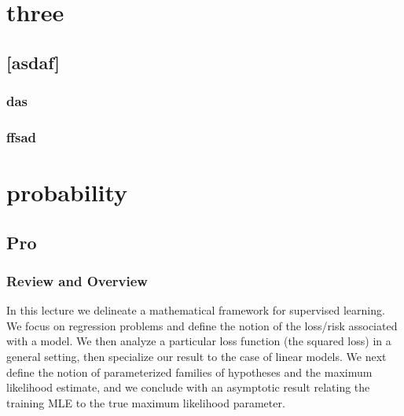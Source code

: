 \documentclass[]{subook}
\begin{document}
\part{three}
\chapter{[asdaf]}
\section{das}
\lipsum[1-3]

\section{ffsad}
\lipsum[1-6]


\part{probability}

\chapter{Pro}
\newcommand{\cX}{\mathcal{X}}
\newcommand{\cY}{\mathcal{Y}}

\section{Review and Overview}
In this lecture we delineate a mathematical framework for supervised learning. We focus on regression problems and define the notion of the loss/risk associated with a model. We then analyze a particular loss function (the squared loss) in a general setting, then specialize our result to the case of linear models. We next define the notion of parameterized families of hypotheses and the maximum likelihood estimate, and we conclude with an asymptotic result relating the training MLE to the true maximum likelihood parameter.
\end{document}
